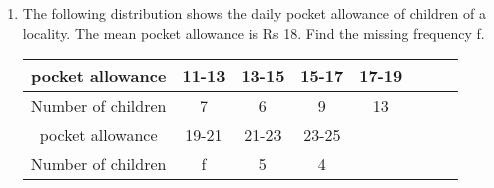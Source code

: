 \renewcommand{\theequation}{\theenumi}
\begin{enumerate}[label=\arabic*.,ref=\thesubsection.\theenumi]
\item The following distribution shows the daily pocket allowance of children of a locality.
The mean pocket allowance is Rs 18. Find the missing frequency f.
\begin{table}


\begin{tabular}{|c|c|c|c|c|c|c|c|}
	\hline
	 pocket allowance &11-13&13-15&15-17&17-19\\
	\hline
	Number of children&7&6&9&13\\
	\hline
	 pocket allowance &19-21&21-23&23-25&\\
	\hline
	Number of children&f&5&4&\\
	\hline
\end{tabular}\\
\end{table}
\end{enumerate}